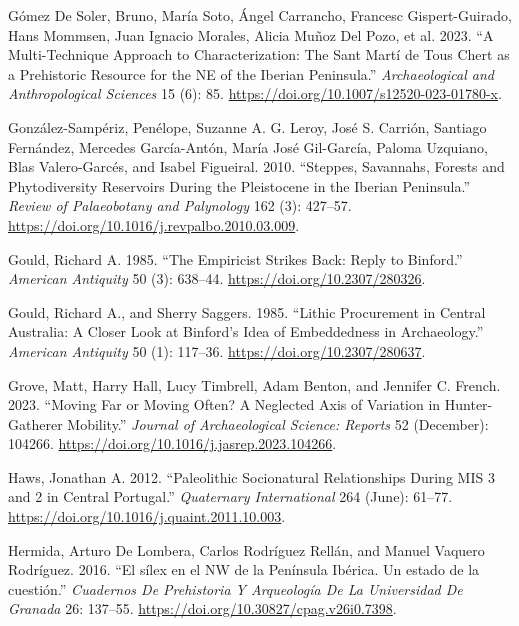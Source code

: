 \documentclass[
  a4paper,
  DIV=11,
  numbers=noendperiod]{scrreprt}
\newlength{\cslhangindent}
\newenvironment{CSLReferences}[2] %
 {\begin{list}{}{%
  \setlength{\itemindent}{0pt}
  \setlength{\leftmargin}{0pt}
  \setlength{\parsep}{0pt}
  \ifodd #1
   \setlength{\leftmargin}{\cslhangindent}
   \setlength{\itemindent}{-1\cslhangindent}
  \fi
  \setlength{\itemsep}{#2\baselineskip}}}
 {\end{list}}
\begin{document}
\begin{CSLReferences}{1}{0}
Gómez De Soler, Bruno, María Soto, Ángel Carrancho, Francesc
Gispert-Guirado, Hans Mommsen, Juan Ignacio Morales, Alicia Muñoz Del
Pozo, et al. 2023. {``A Multi-Technique Approach to Characterization:
The {Sant Mart{í}} de {Tous} Chert as a Prehistoric Resource for the
{NE} of the {Iberian Peninsula}.''} \emph{Archaeological and
Anthropological Sciences} 15 (6): 85.
\url{https://doi.org/10.1007/s12520-023-01780-x}.

González-Sampériz, Penélope, Suzanne A. G. Leroy, José S. Carrión,
Santiago Fernández, Mercedes García-Antón, María José Gil-García, Paloma
Uzquiano, Blas Valero-Garcés, and Isabel Figueiral. 2010. {``Steppes,
Savannahs, Forests and Phytodiversity Reservoirs During the
{Pleistocene} in the {Iberian Peninsula}.''} \emph{Review of
Palaeobotany and Palynology} 162 (3): 427--57.
\url{https://doi.org/10.1016/j.revpalbo.2010.03.009}.

Gould, Richard A. 1985. {``The {Empiricist Strikes Back}: {Reply} to
{Binford}.''} \emph{American Antiquity} 50 (3): 638--44.
\url{https://doi.org/10.2307/280326}.

Gould, Richard A., and Sherry Saggers. 1985. {``Lithic {Procurement} in
{Central Australia}: {A Closer Look} at {Binford}'s {Idea} of
{Embeddedness} in {Archaeology}.''} \emph{American Antiquity} 50 (1):
117--36. \url{https://doi.org/10.2307/280637}.

Grove, Matt, Harry Hall, Lucy Timbrell, Adam Benton, and Jennifer C.
French. 2023. {``Moving Far or Moving Often? {A} Neglected Axis of
Variation in Hunter-Gatherer Mobility.''} \emph{Journal of
Archaeological Science: Reports} 52 (December): 104266.
\url{https://doi.org/10.1016/j.jasrep.2023.104266}.

Haws, Jonathan A. 2012. {``Paleolithic Socionatural Relationships During
{MIS} 3 and 2 in Central {Portugal}.''} \emph{Quaternary International}
264 (June): 61--77. \url{https://doi.org/10.1016/j.quaint.2011.10.003}.

Hermida, Arturo De Lombera, Carlos Rodríguez Rellán, and Manuel Vaquero
Rodríguez. 2016. {``{El s{í}lex en el NW de la Pen{í}nsula Ib{é}rica. Un
estado de la cuesti{ó}n}.''} \emph{Cuadernos De Prehistoria Y
Arqueolog{í}a De La Universidad De Granada} 26: 137--55.
\url{https://doi.org/10.30827/cpag.v26i0.7398}.


\end{CSLReferences}
\end{document}
